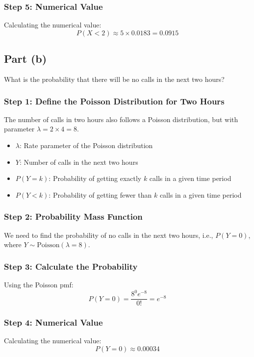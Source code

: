\documentclass[12pt]{article}
\begin{document}
\subsubsection*{Step 5: Numerical Value}
Calculating the numerical value:
\[ P(X < 2) \approx 5 \times 0.0183 = 0.0915 \]

\subsection*{Part (b)} What is the probability that there will be no calls in the next two hours?

\subsubsection*{Step 1: Define the Poisson Distribution for Two Hours}
The number of calls in two hours also follows a Poisson distribution, but with parameter \( \lambda = 2 \times 4 = 8 \).
\begin{itemize}
  \item \( \lambda \): Rate parameter of the Poisson distribution
  \item \( Y \): Number of calls in the next two hours
  \item \( P(Y = k) \): Probability of getting exactly \( k \) calls in a given time period
  \item \( P(Y < k) \): Probability of getting fewer than \( k \) calls in a given time period
\end{itemize}

\subsubsection*{Step 2: Probability Mass Function}
We need to find the probability of no calls in the next two hours, i.e., \( P(Y = 0) \), where \( Y \sim \text{Poisson}(\lambda = 8) \).

\subsubsection*{Step 3: Calculate the Probability}
Using the Poisson pmf:
\[ P(Y = 0) = \frac{8^0 e^{-8}}{0!} = e^{-8} \]

\subsubsection*{Step 4: Numerical Value}
Calculating the numerical value:
\[ P(Y = 0) \approx 0.00034 \]
\end{document}
